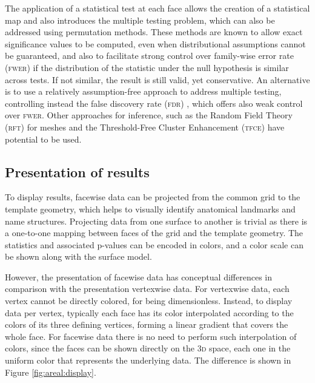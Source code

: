 The application of a statistical test at each face allows the creation of a statistical map and also introduces the multiple testing problem, which can also be addressed using permutation methods. These methods are known to allow exact significance values to be computed, even when distributional assumptions cannot be guaranteed, and also to facilitate strong control over family-wise error rate (\textsc{fwer}) if the distribution of the statistic under the null hypothesis is similar across tests. If not similar, the result is still valid, yet conservative. An alternative is to use a relatively assumption-free approach to address multiple testing, controlling instead the false discovery rate (\textsc{fdr}) \citep{Benjamini1995, Genovese2002}, which offers also weak control over \textsc{fwer}. Other approaches for inference, such as the Random Field Theory (\textsc{rft}) for meshes \citep{Worsley1999, Hagler2006} and the Threshold-Free Cluster Enhancement (\textsc{tfce}) \citep{Smith2009} have potential to be used.

\subsection{Presentation of results}
\label{sec:areal:presentation}

To display results, facewise data can be projected from the common grid to the template geometry, which helps to visually identify anatomical landmarks and name structures. Projecting data from one surface to another is trivial as there is a one-to-one mapping between faces of the grid and the template geometry. The statistics and associated p-values can be encoded in colors, and a color scale can be shown along with the surface model.

However, the presentation of facewise data has conceptual differences in comparison with the presentation vertexwise data. For vertexwise data, each vertex cannot be directly colored, for being dimensionless. Instead, to display data per vertex, typically each face has its color interpolated according to the colors of its three defining vertices, forming a linear gradient that covers the whole face. For facewise data there is no need to perform such interpolation of colors, since the faces can be shown directly on the \textsc{3d} space, each one in the uniform color that represents the underlying data. The difference is shown in Figure \ref{fig:areal:display}.

